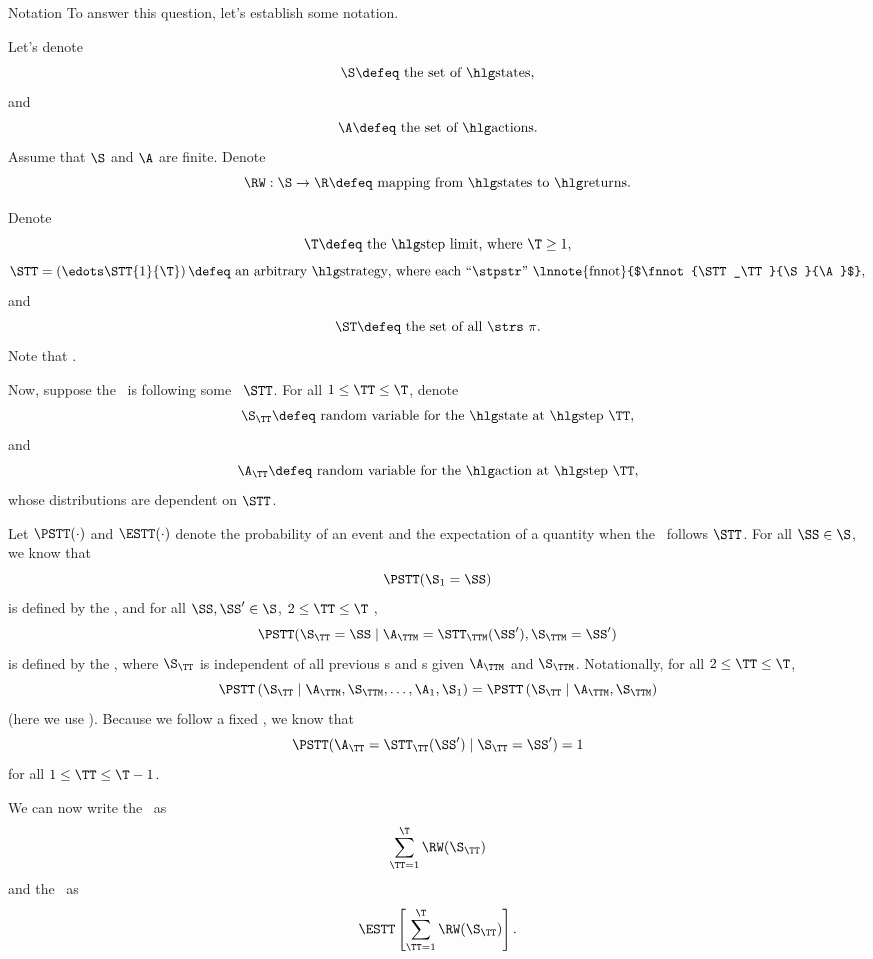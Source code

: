 \begin{part}{Notation}
  To answer this question, let's establish some notation.

  Let's denote
  $$\text{$\S \defeq$ the set of \til{}s},$$
  and 
  $$\text{$\A \defeq$ the set of \act{}s.}$$
  Assume that $\S$ and $\A$ are finite.
  Denote
  $$\text{$\RW : \S \rightarrow \R \defeq$ mapping from \til{}s to \rwd{}s.}$$

  Denote
  $$\text{$\T \defeq$ the \lmt, where $\T \ge 1$},$$
  $$\text{$\STT = \left(\edots\STT{1}{\T}\right) \defeq$ an arbitrary \str, 
  where each ``\stpstr'' \lnnote{fnnot}{$\fnnot{\STT_\TT}{\S}{\A}$}},$$
  and
  $$\text{$\ST \defeq$ the set of all \strs\ $\pi$}.$$
  Note that .

  Now, suppose the \agt\ is following some \str\ $\STT$.
  For all $1 \le \TT \le \T$,
  denote
  $$\text{$\S_\TT \defeq$ random variable for the \til\ at \stp\ $\TT$},$$
  and
  $$\text{$\A_\TT \defeq$ random variable for the \act\ at \stp\ $\TT$},$$
  whose distributions are dependent on $\STT$.

  Let $\PSTT(\cdot)$ and $\ESTT(\cdot)$ denote the probability of an event
  and the expectation of a quantity
  when the \agt\ follows $\STT$.
  For all $\SS \in \S$, we know that
  $$\PSTT(\S_1 = \SS)$$
  is defined by the \ind, and
  for all $\SS, \SS' \in \S$, $2 \le \TT \le \T$ 
  ,
  $$\PSTT(\S_\TT = \SS \mid \A_\TTM = \STT_\TTM(\SS'), \S_\TTM = \SS')$$
  is defined by the \trd, where 
  $\S_\TT$ is independent of all previous \til{}s and \act{}s given $\A_\TTM$ and $\S_\TTM$.
  Notationally, for all $2 \le \TT \le \T$,
  $$ 
  \PSTT\left( \S_\TT \mid \A_{\TTM}, \S_{\TTM}, \ldots, \A_{1}, \S_{1} \right)
  = 
  \PSTT\left( \S_\TT \mid \A_{\TTM}, \S_{\TTM}\right)
  $$
  (here we use ).
  Because we follow a fixed \str, we know that
  $$\PSTT(\A_\TT = \STT_\TT(\SS') \mid \S_\TT = \SS') = 1$$
  for all
  $1 \le \TT \le \T - 1$.

  We can now write the \trwd\ as
  $$\sum_{\TT = 1}^\T \RW(\S_\TT)$$
  and the \atrwd\ as
  $$\ESTT\left[\sum_{\TT = 1}^\T \RW(\S_\TT)\right].$$
\end{part}
